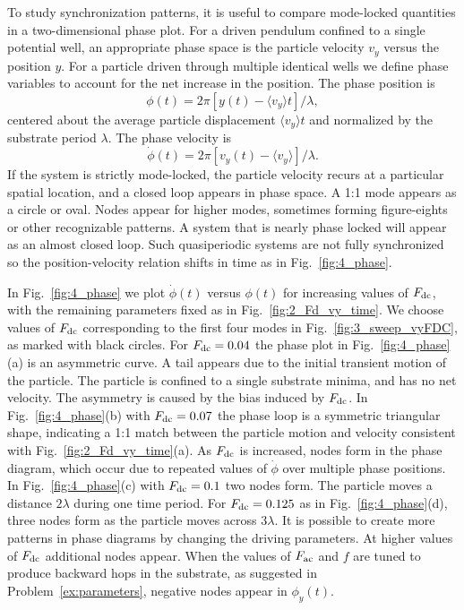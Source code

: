 \documentclass[preprint,showpacs,preprintnumbers,amsmath,amssymb,aps,prb]{revtex4-1}
\theoremstyle{remark}
\begin{document}
  To study synchronization patterns, 
  it is useful to compare
  mode-locked quantities 
  in a two-dimensional phase plot. 
  For a driven pendulum confined to a single potential well,
  an appropriate
  phase space is the particle velocity $v_y$ versus the position $y$.  
  For a particle driven 
  through multiple identical wells 
  we define phase variables 
  to account for the net increase in the position.
  The phase position is
  \begin{equation}
    \phi(t) = 2\pi [y(t)-\langle v_y \rangle t]/\lambda,
  \end{equation}
  centered about the average particle displacement $\langle v_y \rangle t$
  and normalized by the substrate period $\lambda$.\cite{Juniper2015}
  The phase velocity is
  \begin{equation}
    \dot{\phi}(t) =2\pi [v_y(t)-\langle v_y \rangle] /\lambda.  
  \end{equation}
If the system
  is strictly mode-locked,
  the particle velocity
  recurs at a particular spatial location, and 
a closed loop appears in  
  phase space. 
  A 1:1 mode appears as a circle or oval. 
  Nodes appear 
  for higher modes,
  sometimes forming figure-eights
  or other recognizable patterns.
  A system that is nearly phase locked
  will appear as an almost closed loop.
  Such quasiperiodic systems are
  not fully synchronized
  so the position-velocity relation
  shifts in time as in Fig.~\ref{fig:4_phase}.
  
  In Fig.~\ref{fig:4_phase}
  we plot $\dot{\phi}(t)$ versus $\phi(t)$
  for increasing values of
  $F_{\rm dc}$, 
  with the remaining parameters fixed as in Fig.~\ref{fig:2_Fd_vy_time}.
  We choose values of $F_{\rm dc}$
  corresponding to the first four modes in
  Fig.~\ref{fig:3_sweep_vyFDC},
  as marked with black circles.
  For
  $F_{\rm dc} = 0.04$
  the phase plot   in Fig.~\ref{fig:4_phase}(a)  is an
  asymmetric curve.
  A tail appears
  due to the initial transient
  motion of the particle.
  The particle is confined to a single
  substrate minima,
  and has no net velocity.
  The asymmetry is caused by the bias induced by $F_{\rm dc}$.
  In Fig.~\ref{fig:4_phase}(b)
  with $F_{\rm dc} = 0.07$
  the phase loop is a symmetric triangular shape,
  indicating a 1:1 match between the
  particle motion and velocity consistent with 
  Fig.~\ref{fig:2_Fd_vy_time}(a).
  As $F_{\rm dc}$ is
  increased,
  nodes form in the phase diagram, which occur
  due to repeated values
  of $\dot{\phi}$ over multiple phase positions.
  In Fig.~\ref{fig:4_phase}(c)
  with $F_{\rm dc} = 0.1$
  two nodes form.
  The particle moves a distance $2\lambda$
  during one time period.
For $F_{\rm dc} = 0.125$ as in Fig.~\ref{fig:4_phase}(d),
three nodes form as the particle moves across $3\lambda$.
It is possible to create
more patterns in phase diagrams 
by changing the driving parameters.
At higher values of $F_{\rm dc}$
additional nodes appear.
When the values of $F_{\rm ac}$ and $f$
are tuned to produce backward hops in the substrate,
as suggested in Problem~\ref{ex:parameters}, 
negative nodes appear in $\phi_y(t)$.
  
\end{document}
